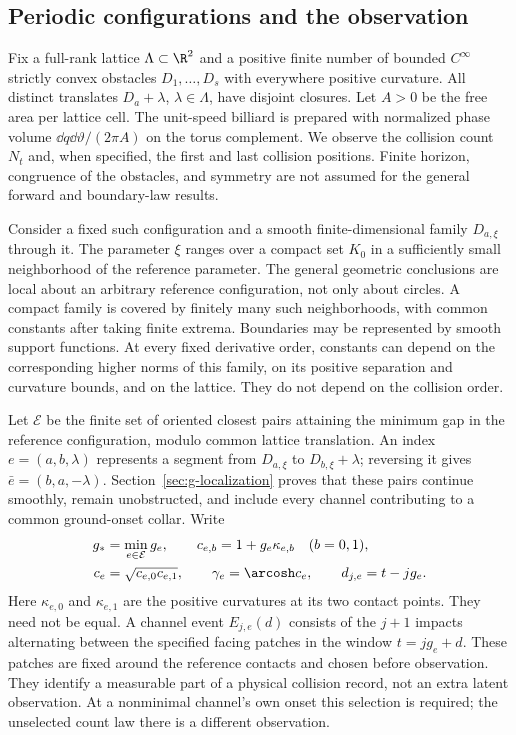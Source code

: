 \subsection{Periodic configurations and the observation}
Fix a full-rank lattice $\Lambda\subset\R^2$ and a positive finite number of bounded
$C^\infty$ strictly convex obstacles $D_1,\ldots,D_s$ with everywhere
positive curvature. All distinct translates $D_a+\lambda$, $\lambda\in
\Lambda$, have disjoint closures. Let $A>0$ be the free area per lattice
cell. The unit-speed billiard is prepared with normalized phase volume
$\dd q\dd\vartheta/(2\pi A)$ on the torus complement. We observe the
collision count $N_t$ and, when specified, the first and last collision
positions. Finite horizon, congruence of the obstacles, and symmetry
are not assumed for the general forward and boundary-law results.

Consider a fixed such configuration and a smooth finite-dimensional
family $D_{a,\xi}$ through it. The parameter $\xi$ ranges over a compact
set $K_0$ in a sufficiently small neighborhood of the reference parameter.
The general geometric conclusions are local about an arbitrary reference configuration,
not only about circles. A compact family is covered by finitely many
such neighborhoods, with common constants after taking finite extrema.
Boundaries may be represented by smooth support functions. At every
fixed derivative order, constants can depend on the corresponding
higher norms of this family, on its positive separation and curvature
bounds, and on the lattice. They do not depend on the collision order.

Let $\mathcal E$ be the finite set of oriented closest pairs attaining
the minimum gap in the reference configuration, modulo common lattice
translation. An index $e=(a,b,\lambda)$ represents a segment from
$D_{a,\xi}$ to $D_{b,\xi}+\lambda$; reversing it gives
$\bar e=(b,a,-\lambda)$. Section~\ref{sec:g-localization} proves that
these pairs continue smoothly, remain unobstructed, and include every
channel contributing to a common ground-onset collar. Write
\begin{equation}\label{eq:g-general-data}
 \begin{split}
 g_*&=\min_{e\in\mathcal E}g_e,\qquad
 c_{e,b}=1+g_e\kappa_{e,b}\quad(b=0,1),\\
 c_e&=\sqrt{c_{e,0}c_{e,1}},\qquad \gamma_e=\arcosh c_e,
 \qquad d_{j,e}=t-jg_e.
 \end{split}
\end{equation}
Here $\kappa_{e,0}$ and $\kappa_{e,1}$ are the positive curvatures at
its two contact points. They need not be equal. A channel event
$E_{j,e}(d)$ consists of the $j+1$ impacts alternating between the
specified facing patches in the window $t=jg_e+d$. These patches are
fixed around the reference contacts and chosen before observation.
They identify a measurable part of a physical collision record, not an
extra latent observation. At a nonminimal channel's own onset this
selection is required; the unselected count law there is a different
observation.

